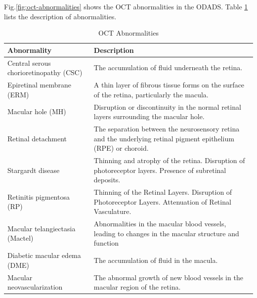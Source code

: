 \documentclass{article}
\begin{document}
		Fig.\ref{fig:oct-abnormalities} shows the OCT abnormalities in the ODADS.
		Table \ref{tb:oct-abnormalites} lists the description of abnormalities.
		
		{
			\fontsize{9}{12}\selectfont
			{
				\begin{longtable}{lp{3.8in}}
				\caption{OCT Abnormalities}
				\label{tb:oct-abnormalites}\\
				\toprule
				Abnormality&Description\\
				\toprule
				
				\multicolumn{1}{l}{Central serous chorioretinopathy (CSC)}
				& \multicolumn{1}{l}{The accumulation of fluid underneath the retina.}\\
				
				\multicolumn{1}{l}{Epiretinal membrane (ERM)}
				& A thin layer of fibrous tissue forms on the surface of the retina, particularly the macula.\\
				
				\multicolumn{1}{l}{Macular hole (MH)}
				& Disruption or discontinuity in the normal retinal layers surrounding the macular hole.\\
				
				\multicolumn{1}{l}{Retinal detachment}
				& The separation between the neurosensory retina and the underlying retinal pigment epithelium (RPE) or choroid.\\

				\multicolumn{1}{l}{Stargardt disease}
				& Thinning and atrophy of the retina. Disruption of photoreceptor layers. Presence of subretinal deposits.\\

				\multicolumn{1}{l}{Retinitis pigmentosa (RP)}
				& Thinning of the Retinal Layers. Disruption of Photoreceptor Layers. Attenuation of Retinal Vasculature.\\

				\multicolumn{1}{l}{Macular telangiectasia (Mactel)}
				& Abnormalities in the macular blood vessels, leading to changes in the macular structure and function\\

				\multicolumn{1}{l}{Diabetic macular edema (DME)}
				& The accumulation of fluid in the macula. \\

				\multicolumn{1}{l}{Macular neovascularization}
				& The abnormal growth of new blood vessels in the macular region of the retina.\\


\end{longtable}}}
\end{document}
